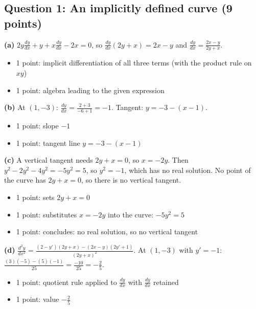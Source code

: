 \documentclass{apcalc}
\begin{document}
\subsection*{Question 1: An implicitly defined curve (9 points)}
\textbf{(a)} $2y\frac{dy}{dx}+y+x\frac{dy}{dx}-2x=0$, so $\frac{dy}{dx}(2y+x)=2x-y$ and $\frac{dy}{dx}=\frac{2x-y}{2y+x}$.
\begin{itemize}[leftmargin=1.6em,itemsep=0pt]
\item 1 point: implicit differentiation of all three terms (with the product rule on $xy$)
\item 1 point: algebra leading to the given expression
\end{itemize}
\textbf{(b)} At $(1,-3)$: $\frac{dy}{dx}=\frac{2+3}{-6+1}=-1$. Tangent: $y=-3-(x-1)$.
\begin{itemize}[leftmargin=1.6em,itemsep=0pt]
\item 1 point: slope $-1$
\item 1 point: tangent line $y=-3-(x-1)$
\end{itemize}
\textbf{(c)} A vertical tangent needs $2y+x=0$, so $x=-2y$. Then $y^2-2y^2-4y^2=-5y^2=5$, so $y^2=-1$, which has no real solution. No point of the curve has $2y+x=0$, so there is no vertical tangent.
\begin{itemize}[leftmargin=1.6em,itemsep=0pt]
\item 1 point: sets $2y+x=0$
\item 1 point: substitutes $x=-2y$ into the curve: $-5y^2=5$
\item 1 point: concludes: no real solution, so no vertical tangent
\end{itemize}
\textbf{(d)} $\frac{d^2y}{dx^2}=\frac{(2-y')(2y+x)-(2x-y)(2y'+1)}{(2y+x)^2}$. At $(1,-3)$ with $y'=-1$: $\frac{(3)(-5)-(5)(-1)}{25}=\frac{-10}{25}=-\frac25$.
\begin{itemize}[leftmargin=1.6em,itemsep=0pt]
\item 1 point: quotient rule applied to $\frac{dy}{dx}$ with $\frac{dy}{dx}$ retained
\item 1 point: value $-\frac25$
\end{itemize}
\end{document}
